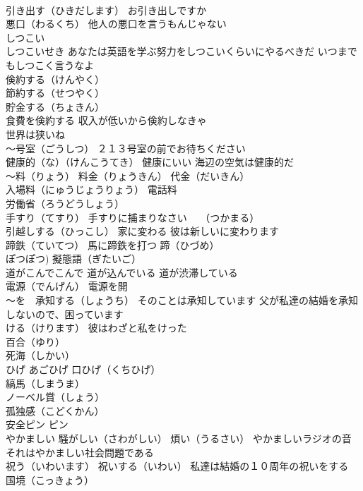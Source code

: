 \documentclass[8pt]{extreport}
\begin{document}
\begin{CJK}{UTF8}{min}
\\	引き出す（ひきだします） お引き出しですか
\\	悪口（わるくち） 他人の悪口を言うもんじゃない
\\	しつこい
\\	しつこいせき あなたは英語を学ぶ努力をしつこいくらいにやるべきだ いつまでもしつこく言うなよ
\\	倹約する（けんやく） 
\\	節約する（せつやく） 
\\	貯金する（ちょきん）
\\	食費を倹約する 収入が低いから倹約しなきゃ
\\	世界は狭いね
\\	～号室（ごうしつ） ２１３号室の前でお待ちください
\\	健康的（な）（けんこうてき） 健康にいい 海辺の空気は健康的だ
\\	～料（りょう） 料金（りょうきん） 代金（だいきん）
\\	入場料（にゅうじょうりょう） 電話料
\\	労働省（ろうどうしょう）
\\	手すり（てすり） 手すりに捕まりなさい　 （つかまる）
\\	引越しする（ひっこし） 家に変わる 彼は新しいに変わります
\\	蹄鉄（ていてつ） 馬に蹄鉄を打つ 蹄（ひづめ）
\\	ぽつぽつ)	擬態語（ぎたいご）
\\	道がこんでこんで 道が込んでいる 道が渋滞している
\\	電源（でんげん） 電源を開
\\	～を　承知する（しょうち） そのことは承知しています 父が私達の結婚を承知しないので、困っています
\\	ける（けります） 彼はわざと私をけった
\\	百合（ゆり）
\\	死海（しかい）
\\	ひげ あごひげ 口ひげ（くちひげ）
\\	縞馬（しまうま）
\\	ノーベル賞（しょう）
\\	孤独感（こどくかん）
\\	安全ピン ピン
\\	やかましい 騒がしい（さわがしい） 煩い（うるさい） やかましいラジオの音 それはやかましい社会問題である
\\	祝う（いわいます） 祝いする（いわい） 私達は結婚の１０周年の祝いをする
\\	国境（こっきょう）

\end{CJK}
\end{document}
